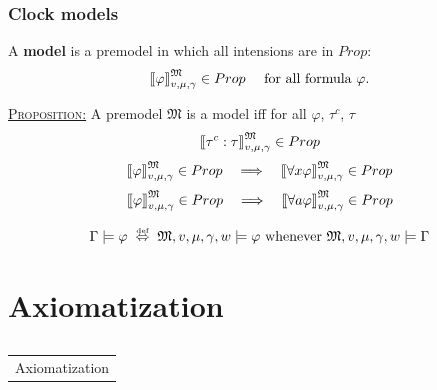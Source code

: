 \documentclass[xcolor=x11names]{beamer}
\makeatletter
\let\beamer@writeslidentry@miniframeson=\beamer@writeslidentry
\def\beamer@writeslidentry@miniframesoff{%
  \expandafter\beamer@ifempty\expandafter{\beamer@framestartpage}{}%
  {%
    \clearpage\beamer@notesactions%
  }
}
\newcommand*{\miniframeson}{\let\beamer@writeslidentry=\beamer@writeslidentry@miniframeson}
\newcommand*{\miniframesoff}{\let\beamer@writeslidentry=\beamer@writeslidentry@miniframesoff}
\newcommand{\cimdia}[1] {\miniframesoff \begin{frame}\begin{center}\huge \begin{tabular}{c}#1\end{tabular}\end{center}\end{frame}\miniframeson}
\newcommand{\szakasz}[2][]{\section{#1}\subsection{}\cimdia{#2}}
\renewcommand{\emph}[1]{\textbf{#1}}
\newcommand{\defekv}[1][.1]{\hspace{#1cm}\overset{\textup{\tiny def}}{ \Leftrightarrow }\hspace{#1cm}}
\newcommand{\wintension}[3][]{{[}\hspace{-.46mm}{[} {#3}{]}\hspace{-.46mm}{]}^{\mathfrak{#1}}_{#2}}
\makeatother
\begin{document}
\begin{frame}
\frametitle{Clock models}
\footnotesize
A \emph{model} is a premodel in which all intensions are in $Prop$:
\[ \wintension[M]{v, \mu, \gamma }{\varphi}\in Prop \quad \textup{ for all formula $\varphi$.}\]

\smallskip
\underline{\textsc{Proposition:}}
A premodel $\mathfrak M$ is a model iff for all $\varphi$, $\tau^c$, $\tau$
\[ \wintension[M]{v, \mu, \gamma }{\tau^c: \tau} \in Prop \]
\[ \wintension[M]{v, \mu, \gamma }{\varphi}\in Prop \quad \Longrightarrow \quad \wintension[M]{v, \mu, \gamma }{\forall x \varphi} \in Prop \]
\[ \wintension[M]{v, \mu, \gamma }{\varphi}\in Prop \quad \Longrightarrow \quad \wintension[M]{v, \mu, \gamma }{\forall a \varphi} \in Prop \]


\bigskip

\[\Gamma \models \varphi \defekv  \mathfrak M, v, \mu, \gamma, w \models \varphi \textup{ whenever } \mathfrak M, v, \mu, \gamma, w \models \Gamma \]
\end{frame}
\szakasz[Axiomatization]{Axiomatization}
\end{document}
